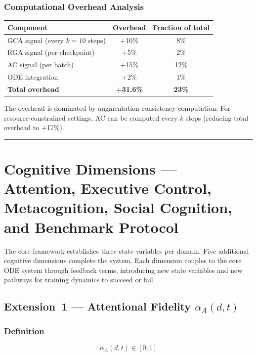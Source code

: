 \documentclass[11pt,a4paper]{article}
\begin{document}
\subsubsection{Computational Overhead Analysis}

\begin{center}
\begin{tabular}{l c c}
\toprule
\textbf{Component} & \textbf{Overhead} & \textbf{Fraction of total} \\
\midrule
GCA signal (every $k=10$ steps) & +10\% & 8\% \\
RGA signal (per checkpoint) & +5\% & 2\% \\
AC signal (per batch) & +15\% & 12\% \\
ODE integration & +2\% & 1\% \\
\midrule
\textbf{Total overhead} & \textbf{+31.6\%} & \textbf{23\%} \\
\bottomrule
\end{tabular}
\end{center}

The overhead is dominated by augmentation consistency computation.
For resource-constrained settings, AC can be computed every $k$ steps
(reducing total overhead to +17\%).

\noindent\rule{\linewidth}{0.4pt}

\section{Cognitive Dimensions --- Attention, Executive Control,
Metacognition, Social Cognition, and Benchmark Protocol}\label{sec:cognitive-dimensions}

The core framework establishes three state variables per domain. Five
additional cognitive dimensions complete the system. Each dimension couples to the core ODE system through feedback terms, introducing new state variables and new pathways for training dynamics to succeed or fail.

\subsection{Extension~1 --- Attentional Fidelity \texorpdfstring{$\alpha_A(d,t)$}{alpha\_A(d,t)}}\label{sec:attention}

\subsubsection{Definition}
\begin{equation}\label{eq:alpha-bounds}
\alpha_A(d,t) \in [0,1]
\end{equation}
\end{document}
